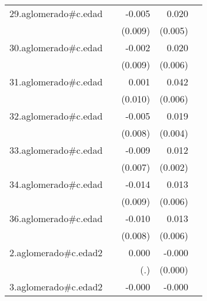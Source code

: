 {\begin{longtable}{l*{4}{D{.}{.}{-1}}}
\addlinespace
29.aglomerado#c.edad&                     &      -0.005         &       0.020\sym{***}&                     \\
            &                     &     (0.009)         &     (0.005)         &                     \\
\addlinespace
30.aglomerado#c.edad&                     &      -0.002         &       0.020\sym{**} &                     \\
            &                     &     (0.009)         &     (0.006)         &                     \\
\addlinespace
31.aglomerado#c.edad&                     &       0.001         &       0.042\sym{***}&                     \\
            &                     &     (0.010)         &     (0.006)         &                     \\
\addlinespace
32.aglomerado#c.edad&                     &      -0.005         &       0.019\sym{***}&                     \\
            &                     &     (0.008)         &     (0.004)         &                     \\
\addlinespace
33.aglomerado#c.edad&                     &      -0.009         &       0.012\sym{***}&                     \\
            &                     &     (0.007)         &     (0.002)         &                     \\
\addlinespace
34.aglomerado#c.edad&                     &      -0.014         &       0.013\sym{*}  &                     \\
            &                     &     (0.009)         &     (0.006)         &                     \\
\addlinespace
36.aglomerado#c.edad&                     &      -0.010         &       0.013\sym{*}  &                     \\
            &                     &     (0.008)         &     (0.006)         &                     \\
\addlinespace
2.aglomerado#c.edad2&                     &       0.000         &      -0.000\sym{**} &                     \\
            &                     &         (.)         &     (0.000)         &                     \\
\addlinespace
3.aglomerado#c.edad2&                     &      -0.000         &      -0.000\sym{***}&                     \\

\end{longtable}}
